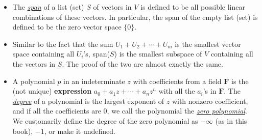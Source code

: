 \documentclass[11pt]{article}
\newcommand{\df}[1]{\ul{\textit{\textsf{#1}}}}
\newcommand{\F}{\mathbf{F}}
\begin{document}
\begin{itemize}
    \item The \df{span} of a list (set) $S$ of vectors in $V$ is defined to be all possible linear combinations of these vectors. In particular, the span of the empty list (set) is defined to be the zero vector space $\{0\}$.
    \item Similar to the fact that the sum $U_1 + U_2 +\cdots+ U_m$ is the smallest vector space containing all $U_i$'s, span($S$) is the smallest subspace of $V$ containing all the vectors in $S$. The proof of the two are almost exactly the same.
    \item A polynomial $p$ in an indeterminate $z$ with coefficients from a field $\F$ is the (not unique) \textbf{expression} $a_0 + a_1 z + \cdots + a_n z^n$ with all the $a_i$'s in $\F$. The \df{degree} of a polynomial is the largest exponent of $z$ with nonzero coefficient, and if all the coefficients are 0, we call the polynomial the \df{zero polynomial}. We customarily define the degree of the zero polynomial as $-\infty$ (as in this book), $-1$, or make it undefined.
    

\end{itemize}
\end{document}
